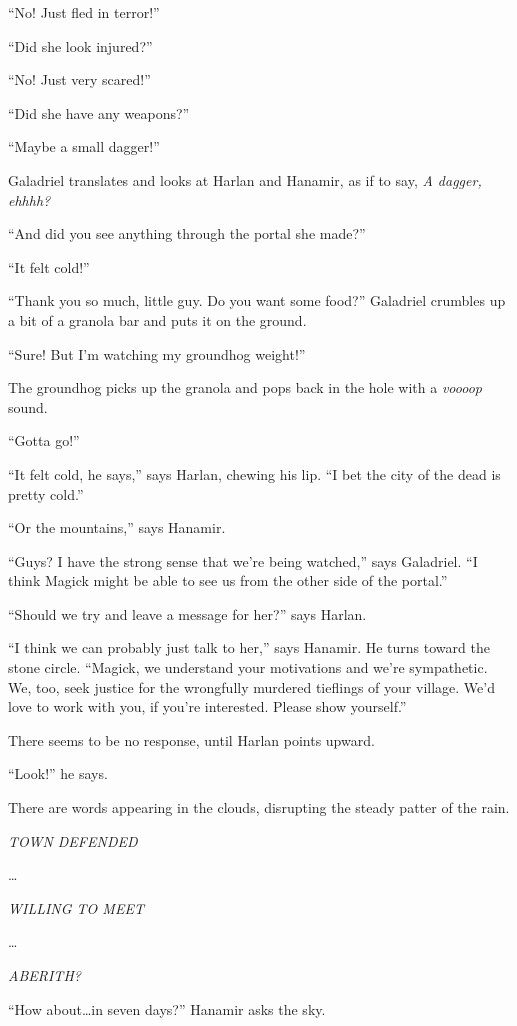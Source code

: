 \documentclass[smalldemyvopaper,11pt,twoside,onecolumn,openright,extrafontsizes]{memoir}
\begin{document}
``No! Just fled in terror!''

``Did she look injured?''

``No! Just very scared!''

``Did she have any weapons?''

``Maybe a small dagger!''

Galadriel translates and looks at Harlan and Hanamir, as if to say,
\emph{A dagger, ehhhh?}

``And did you see anything through the portal she made?''

``It felt cold!''

``Thank you so much, little guy. Do you want some food?'' Galadriel
crumbles up a bit of a granola bar and puts it on the ground.

``Sure! But I'm watching my groundhog weight!''

The groundhog picks up the granola and pops back in the hole with a
\emph{voooop} sound.

``Gotta go!''

``It felt cold, he says,'' says Harlan, chewing his lip. ``I bet the
city of the dead is pretty cold.''

``Or the mountains,'' says Hanamir.

``Guys? I have the strong sense that we're being watched,'' says
Galadriel. ``I think Magick might be able to see us from the other side
of the portal.''

``Should we try and leave a message for her?'' says Harlan.

``I think we can probably just talk to her,'' says Hanamir. He turns
toward the stone circle. ``Magick, we understand your motivations and
we're sympathetic. We, too, seek justice for the wrongfully murdered
tieflings of your village. We'd love to work with you, if you're
interested. Please show yourself.''

There seems to be no response, until Harlan points upward.

``Look!'' he says.

There are words appearing in the clouds, disrupting the steady patter of
the rain.

\emph{TOWN DEFENDED}

\ldots{}

\emph{WILLING TO MEET}

\ldots{}

\emph{ABERITH?}

``How about\ldots in seven days?'' Hanamir asks the sky.
\end{document}
